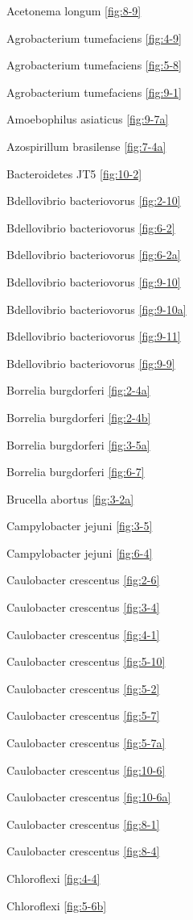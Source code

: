 \documentclass[]{tufte-book}
\begin{document}
Acetonema longum \ref{fig:8-9}

Agrobacterium tumefaciens \ref{fig:4-9}

Agrobacterium tumefaciens \ref{fig:5-8}

Agrobacterium tumefaciens \ref{fig:9-1}

Amoebophilus asiaticus \ref{fig:9-7a}

Azospirillum brasilense \ref{fig:7-4a}

Bacteroidetes JT5 \ref{fig:10-2}

Bdellovibrio bacteriovorus \ref{fig:2-10}

Bdellovibrio bacteriovorus \ref{fig:6-2}

Bdellovibrio bacteriovorus \ref{fig:6-2a}

Bdellovibrio bacteriovorus \ref{fig:9-10}

Bdellovibrio bacteriovorus \ref{fig:9-10a}

Bdellovibrio bacteriovorus \ref{fig:9-11}

Bdellovibrio bacteriovorus \ref{fig:9-9}

Borrelia burgdorferi \ref{fig:2-4a}

Borrelia burgdorferi \ref{fig:2-4b}

Borrelia burgdorferi \ref{fig:3-5a}

Borrelia burgdorferi \ref{fig:6-7}

Brucella abortus \ref{fig:3-2a}

Campylobacter jejuni \ref{fig:3-5}

Campylobacter jejuni \ref{fig:6-4}

Caulobacter crescentus \ref{fig:2-6}

Caulobacter crescentus \ref{fig:3-4}

Caulobacter crescentus \ref{fig:4-1}

Caulobacter crescentus \ref{fig:5-10}

Caulobacter crescentus \ref{fig:5-2}

Caulobacter crescentus \ref{fig:5-7}

Caulobacter crescentus \ref{fig:5-7a}

Caulobacter crescentus \ref{fig:10-6}

Caulobacter crescentus \ref{fig:10-6a}

Caulobacter crescentus \ref{fig:8-1}

Caulobacter crescentus \ref{fig:8-4}

Chloroflexi \ref{fig:4-4}

Chloroflexi \ref{fig:5-6b}
\end{document}
